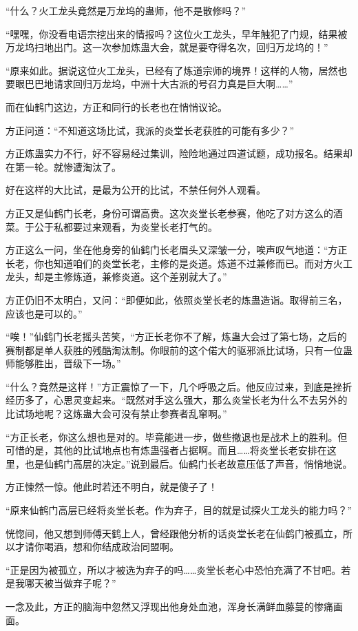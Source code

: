 \begin{this_body}
“什么？火工龙头竟然是万龙坞的蛊师，他不是散修吗？”

“嘿嘿，你没看电语宗挖出来的情报吗？这位火工龙头，早年触犯了门规，结果被万龙坞扫地出门。这一次参加炼蛊大会，就是要夺得名次，回归万龙坞的！”

“原来如此。据说这位火工龙头，已经有了炼道宗师的境界！这样的人物，居然也要眼巴巴地请求回归万龙坞，中洲十大古派的号召力真是巨大啊……”

而在仙鹤门这边，方正和同行的长老也在悄悄议论。

方正问道：“不知道这场比试，我派的炎堂长老获胜的可能有多少？”

方正炼蛊实力不行，好不容易经过集训，险险地通过四道试题，成功报名。结果却在第一轮。就惨遭淘汰了。

好在这样的大比试，是最为公开的比试，不禁任何外人观看。

方正又是仙鹤门长老，身份可谓高贵。这次炎堂长老参赛，他吃了对方这么的酒菜。于公于私都要过来观看，为炎堂长老打气的。

方正这么一问，坐在他身旁的仙鹤门长老眉头又深皱一分，唉声叹气地道：“方正长老，你也知道咱们的炎堂长老，主修的是炎道。炼道不过兼修而已。而对方火工龙头，却是主修炼道，兼修炎道。这个差别就大了。”

方正仍旧不太明白，又问：“即便如此，依照炎堂长老的炼蛊造诣。取得前三名，应该也是可以的。”

“唉！”仙鹤门长老摇头苦笑，“方正长老你不了解，炼蛊大会过了第七场，之后的赛制都是单人获胜的残酷淘汰制。你眼前的这个偌大的驱邪派比试场，只有一位蛊师能够胜出，晋级下一场。”

“什么？竟然是这样！”方正震惊了一下，几个呼吸之后。他反应过来，到底是挫折经历多了，心思灵变起来。“既然对手这么强大，那么炎堂长老为什么不去另外的比试场地呢？这炼蛊大会可没有禁止参赛者乱窜啊。”

“方正长老，你这么想也是对的。毕竟能进一步，做些撤退也是战术上的胜利。但可惜的是，其他的比试地点也有炼蛊强者占据啊。而且……将炎堂长老安排在这里，也是仙鹤门高层的决定。”说到最后。仙鹤门长老故意压低了声音，悄悄地说。

方正悚然一惊。他此时若还不明白，就是傻子了！

“原来仙鹤门高层已经将炎堂长老。作为弃子，目的就是试探火工龙头的能力吗？”

恍惚间，他又想到师傅天鹤上人，曾经跟他分析的话炎堂长老在仙鹤门被孤立，所以才请你喝酒，想和你结成政治同盟啊。

“正是因为被孤立，所以才被选为弃子的吗……炎堂长老心中恐怕充满了不甘吧。若是我哪天被当做弃子呢？”

一念及此，方正的脑海中忽然又浮现出他身处血池，浑身长满鲜血藤蔓的惨痛画面。


\end{this_body}
